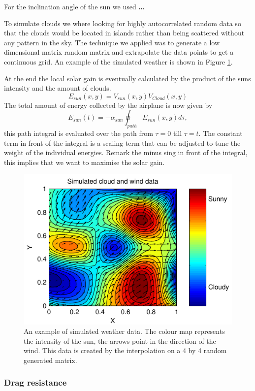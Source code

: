 For the inclination angle of the sun we used \textbf{\dots}

To simulate clouds we where looking for highly autocorrelated random data so that the clouds would be located in islands rather than being scattered without any pattern in the sky.
The technique we applied was to generate a low dimensional matrix random matrix and extrapolate the data points to get a continuous grid.
An example of the simulated weather is shown in Figure \ref{fig:RandomWeather}.

At the end the local solar gain is eventually calculated by the product of the suns intensity and the amount of clouds.
\begin{equation}
E_{sun}(x,y)  =  V_{sun}(x,y) V_{Cloud}(x,y)
\end{equation}
The total amount of energy collected by the airplane is now given by 
\begin{equation}
E_{sun}(t)  =  -\alpha_{sun}\oint_{path} E_{sun}(x,y)  d\tau,
\end{equation}
this path integral is evaluated over the path from $ \tau=0 $ till $ \tau=t $.
The constant term in front of the integral is a scaling term that can be adjusted to tune the weight of the individual energies.
Remark the minus sing in front of the integral, this implies that we want to maximise the solar gain.



\begin{figure}
\centering
\includegraphics[width=0.5\linewidth]{../src/plot/RandomWeather}
\caption{An example of  simulated weather data. The colour map represents the intensity of the sun, the arrows point in the direction of the wind. This data is created by the  interpolation on a 4 by 4 random generated matrix. }
\label{fig:RandomWeather}
\end{figure}


\subsubsection{Drag resistance}

